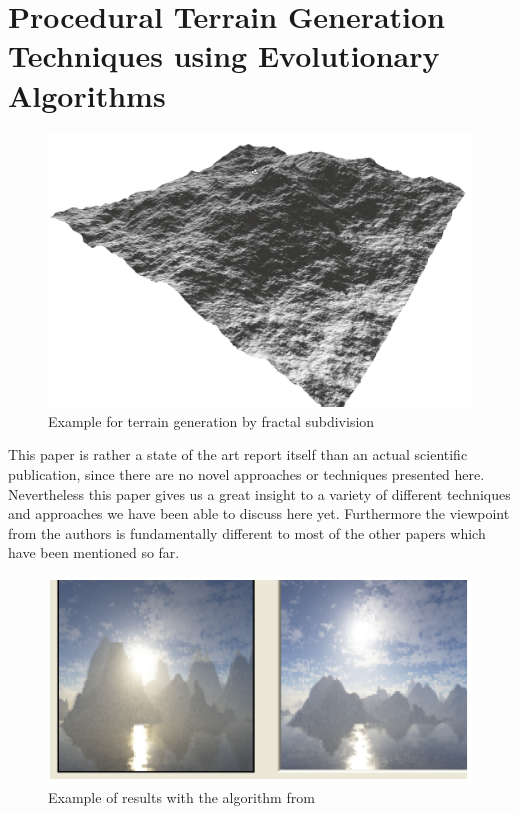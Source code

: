 \section{Procedural Terrain Generation Techniques using Evolutionary Algorithms}

\begin{figure}[htb]
	\centering
	\includegraphics[width=\linewidth]{RZL12/06256610_1.png}
	\caption{Example for terrain generation by fractal subdivision}
	\label{fig:frag_subdev}
\end{figure}

This paper \cite{raffe2012survey} is rather a state of the art report itself than an actual scientific publication, since there are no novel approaches or techniques presented here. Nevertheless this paper gives us a great insight to a variety of different techniques and approaches we have been able to discuss here yet. Furthermore the viewpoint from the authors is fundamentally different to most of the other papers which have been mentioned so far.

\begin{figure}[htb]
	\centering
	\includegraphics[width=\linewidth]{RZL12/5zr45zr6z5.png}
	\caption{Example of results with the algorithm from \cite{walsh2011use}}
	\label{fig:tag17}
\end{figure}

